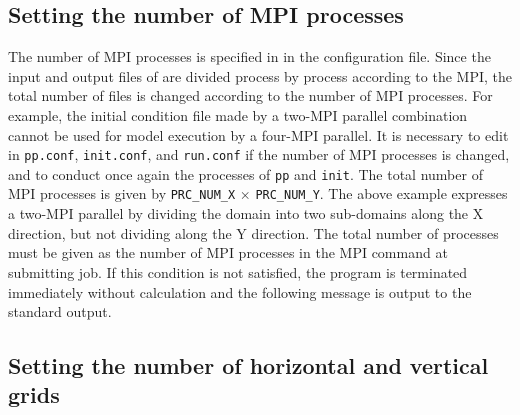 \subsection{Setting the number of MPI processes} \label{subsec:relation_dom_reso2}

The number of MPI processes is specified in  in the configuration file. Since the input and output files of \scalerm are divided process by process according to the MPI, the total number of files is changed according to the number of MPI processes. For example, the initial condition file made by a two-MPI parallel combination cannot be used for model execution by a four-MPI parallel.
It is necessary to edit  in \verb|pp.conf|, \verb|init.conf|, and \verb|run.conf| if the number of MPI processes is changed,
and to conduct once again the processes of \verb|pp| and \verb|init|.
The total number of MPI processes is given by \verb|PRC_NUM_X| $\times$ \verb|PRC_NUM_Y|.
The above example expresses a two-MPI parallel by dividing the domain into two sub-domains along the X direction, but not dividing along the Y direction. The total number of processes must be given as the number of MPI processes in the MPI command at submitting job. If this condition is not satisfied,  the program is terminated immediately without calculation and the following message is output to the standard output.

\subsection{Setting the number of horizontal and vertical grids} \label{subsec:relation_dom_reso3}

